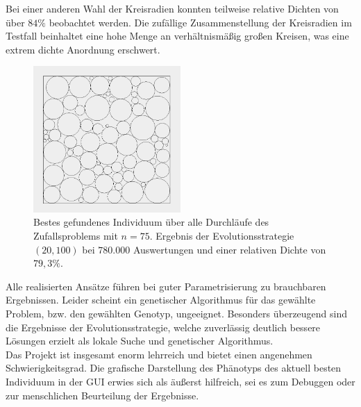 \documentclass[twoside,bibtotoc]{report}
\begin{document}
Bei einer anderen Wahl der Kreisradien konnten teilweise relative Dichten von über $84\%$ beobachtet werden.
Die zufällige Zusammenstellung der Kreisradien im Testfall beinhaltet eine hohe Menge an verhältnismäßig großen Kreisen, was eine extrem dichte Anordnung erschwert.

\begin{figure}[H]
 \centering
 \includegraphics [width=0.5\textwidth]{Bilder/best_n75.png}
 \caption{
 	Bestes gefundenes Individuum über alle Durchläufe des Zufallsproblems mit $n = 75$.
 	Ergebnis der Evolutionsstrategie $(20, 100)$ bei $780.000$ Auswertungen und einer relativen Dichte von $79,3\%$.
 	}
 \label{fig:optimum_n75}
\end{figure}

\nsecend%


Alle realisierten Ansätze führen bei guter Parametrisierung zu brauchbaren Ergebnissen.
Leider scheint ein genetischer Algorithmus für das gewählte Problem, bzw. den gewählten Genotyp, ungeeignet.
Besonders überzeugend sind die Ergebnisse der Evolutionsstrategie, welche zuverlässig deutlich bessere Lösungen erzielt als lokale Suche und genetischer Algorithmus.\\

Das Projekt ist insgesamt enorm lehrreich und bietet einen angenehmen Schwierigkeitsgrad.
Die grafische Darstellung des Phänotyps des aktuell besten Individuum in der \gls{GUI} erwies sich als äußerst hilfreich, sei es zum Debuggen oder zur menschlichen Beurteilung der Ergebnisse.

\nsecend%

\nsecend%


\end{document}
